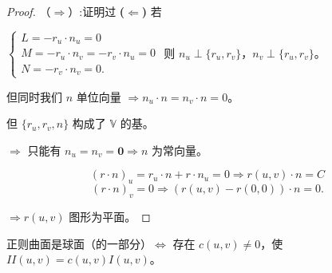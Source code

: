 \documentclass[lang=cn,10pt,thmcnt=section]{elegantbook}
\renewcommand{\vec}[1]{\mathbf{#1}}
\begin{document}
\begin{proof}
    （$\Rightarrow$）:证明过
    \textbf{($\Leftarrow$)} 若

$\begin{cases}
L = -r_u \cdot n_u = 0 \\
M = -r_u \cdot n_v = -r_v \cdot n_u = 0 \\
N = -r_v \cdot n_v = 0.
\end{cases}$
则 $n_u \perp \{r_u, r_v\}$，$n_v \perp \{r_u, r_v\}$。

但同时我们 $n$ 单位向量 $\Rightarrow n_u \cdot n = n_v \cdot n = 0$。

但 $\{r_u, r_v, n\}$ 构成了 $\mathbb{V}$ 的基。

$\Rightarrow$ 只能有 $n_u = n_v = \vec{0} \Rightarrow n$ 为常向量。

$$
(r \cdot n)_u = r_u \cdot n + r \cdot n_u = 0 \Rightarrow r(u,v) \cdot n = C
$$
$$
(r \cdot n)_v = 0 \Rightarrow (r(u,v) - r(0,0)) \cdot n = 0.
$$

$\Rightarrow r(u,v)$ 图形为平面。

\end{proof}
\begin{proposition}
    正则曲面是球面（的一部分）$\Leftrightarrow$ 存在 $c(u,v) \neq 0$，使 $II(u,v) = c(u,v)I(u,v)$。
\end{proposition}
\end{document}
